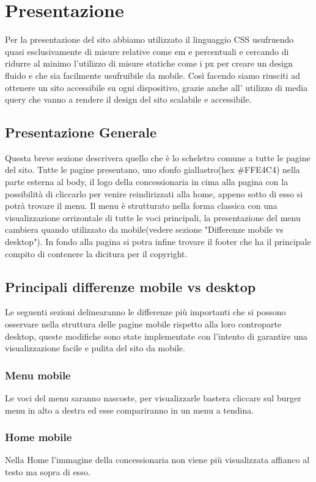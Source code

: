 \section{Presentazione}
    Per la presentazione del sito abbiamo utilizzato il linguaggio CSS usufruendo quasi esclusivamente di misure relative come em e percentuali e cercando di ridurre al minimo l'utilizzo di misure statiche come i px per creare un design fluido e che sia facilmente usufruibile da mobile.
    Così facendo siamo riusciti ad ottenere un sito accessibile su ogni dispositivo, grazie anche all' utilizzo di media query che vanno a rendere il design del sito scalabile e accessibile.
    
    \subsection{Presentazione Generale}
    Questa breve sezione descrivera quello che è lo scheletro comune a tutte le pagine del sito.
    Tutte le pagine presentano, uno sfonfo giallastro(hex #FFE4C4) nella parte esterna al body, il logo della concessionaria in cima alla pagina con la possibilità di cliccarlo per venire reindirizzati alla home, appeno sotto di esso si potrà trovare il menu. Il menu è strutturato nella forma classica con una visualizzazione orrizontale di tutte le voci principali, la presentazione del menu cambiera quando utilizzato da mobile(vedere sezione "Differenze mobile vs desktop"). In fondo alla pagina si potra infine trovare il footer che ha il principale compito di contenere la dicitura per il copyright.

    \subsection{Principali differenze mobile vs desktop}
    Le seguenti sezioni delinearanno le differenze più importanti che si possono osservare nella struttura delle pagine mobile rispetto alla loro controparte desktop, queste modifiche sono state implementate con l'intento di garantire una visualizzazione facile e pulita del sito da mobile.

        \subsubsection{Menu mobile}
        Le voci del menu saranno nascoste, per visualizzarle bastera cliccare sul burger menu in alto a destra ed esse compariranno in un menu a tendina.

        \subsubsection{Home mobile}
        Nella Home l'immagine della concessionaria non viene più visualizzata affianco al testo ma sopra di esso.

